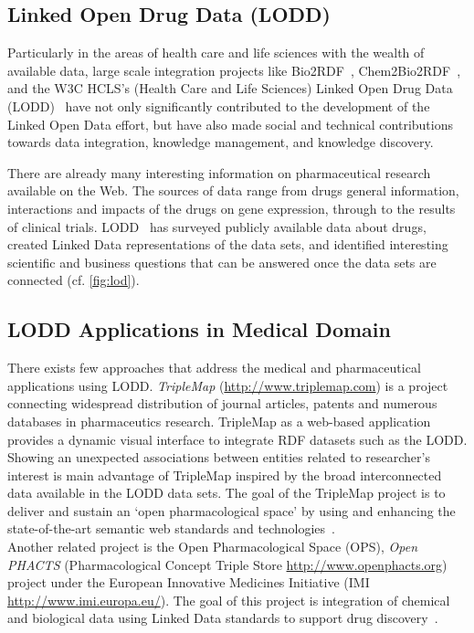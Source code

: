 \documentclass[journal]{IEEEtran}
\begin{document}
\subsection{Linked Open Drug Data (LODD)}
Particularly in the areas of health care and life sciences with the wealth of available data, large scale integration projects like Bio2RDF~\cite{bio2rdf}, Chem2Bio2RDF~\cite{chembio}, and the W3C HCLS’s (Health Care and Life Sciences) Linked Open Drug Data (LODD)~\cite{lodd} have not only significantly contributed to the development of the Linked Open Data effort, but have also made social and technical contributions towards data integration, knowledge management, and knowledge discovery.

There are already many interesting information on pharmaceutical research available on the Web.
The sources of data range from drugs general information, interactions and impacts of the drugs on gene expression, through to the results of clinical trials.
LODD~\cite{lodrug} has surveyed publicly available data about drugs, created Linked Data representations of the data sets, and identified interesting scientific and business questions that can be answered once the data sets are connected (cf. \autoref{fig:lod}).

\subsection{LODD Applications in Medical Domain}

There exists few approaches that address the medical and pharmaceutical applications using LODD.
\emph{TripleMap} (\url{http://www.triplemap.com}) is a project connecting widespread distribution of journal articles, patents and numerous databases in pharmaceutics research.
TripleMap as a web-based application provides a dynamic visual interface to integrate RDF datasets such as the LODD.
Showing an unexpected associations between entities related to researcher's interest is main advantage of TripleMap inspired  by the broad interconnected data available in the LODD data sets.
The goal of the TripleMap project is to deliver and sustain an ‘open pharmacological space’ by using and enhancing the state-of-the-art semantic web standards and technologies~\cite{TripleMap}.\\

 Another related project is the Open Pharmacological Space (OPS), \emph{Open PHACTS} (Pharmacological Concept Triple Store \url{http://www.openphacts.org}) project under the European Innovative Medicines Initiative (IMI \url{http://www.imi.europa.eu/}).
 The goal of this project is integration of chemical and biological data using Linked Data standards to support drug discovery~\cite{Openphacts}.\\
\end{document}
